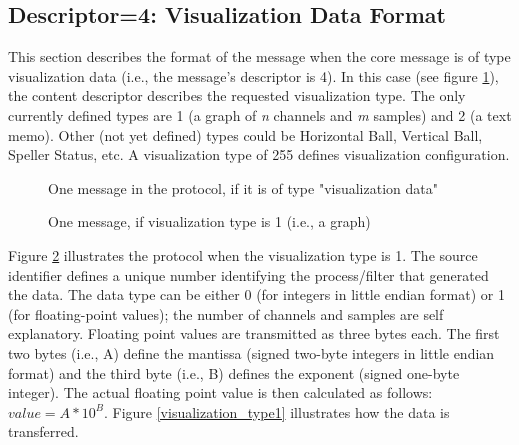 \documentclass[letterpaper,oneside,12pt]{book}
\begin{document}
\subsection{Descriptor=4: Visualization Data Format}
\label{visualizationdata_format}

This section describes the format of the message when the core message is of 
type visualization data (i.e., the message's descriptor is 4). In this case (see 
figure \ref{visualizationprotocol}), the content descriptor describes the 
requested visualization type. The only currently defined types are 1 (a graph of 
\textit{n} channels and \textit{m} samples) and 2 (a text memo). Other (not yet 
defined) types could be Horizontal Ball, Vertical Ball, Speller Status, etc. A 
visualization type of 255 defines visualization configuration.

\begin{figure}[ht]
 \centerline{}
 \caption{One message in the protocol, if it is of type "visualization data"}
 \label{visualizationprotocol}
\end{figure}

\begin{figure}[ht]
 \centerline{}
 \caption{One message, if visualization type is 1 (i.e., a graph)}
 \label{visualizationprotocol_type1}
\end{figure}

Figure \ref{visualizationprotocol_type1} illustrates the protocol when the 
visualization type is 1. The source identifier defines a unique number 
identifying the process/filter that generated the data. The data type can be 
either 0 (for integers in little endian format) or 1 (for floating-point 
values); the number of channels and samples are self explanatory. Floating point 
values are transmitted as three bytes each. The first two bytes (i.e., A) define 
the mantissa (signed two-byte integers in little endian format) and the third 
byte (i.e., B) defines the exponent (signed one-byte integer). The actual floating 
point value is then calculated as follows: $value=A*10^{B}$. Figure 
\ref{visualization_type1} illustrates how the data is transferred.
\end{document}
